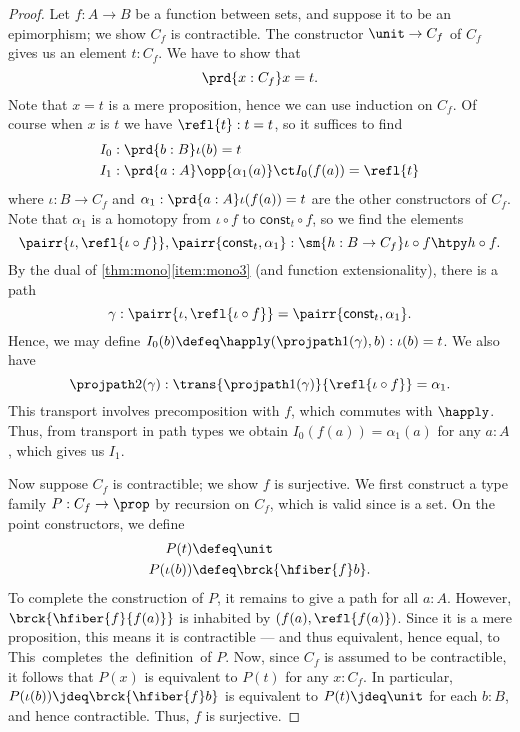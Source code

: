 \begin{proof}
Let $f:A\to B$ be a function between sets, and suppose it to be an epimorphism; we show $C_f$ is contractible.
The constructor $\unit\to C_f$ of $C_f$ gives us an element $t:C_f$.
We have to show that
\begin{equation*}
\prd{x:C_f} x= t.
\end{equation*}
Note that $x= t$ is a mere proposition, hence we can use induction on $C_f$.
Of course when $x$ is $t$ we have $\refl{t}:t=t$, so it suffices to find
\begin{align*}
I_0 & : \prd{b:B} \iota(b)= t\\
I_1 & : \prd{a:A} \opp{\alpha_1(a)} \ct I_0(f(a))=\refl{t}
\end{align*}
where $\iota:B\to C_f$ and $\alpha_1:\prd{a:A} \iota(f(a))= t$ are the other constructors
of $C_f$. Note that $\alpha_1$ is a homotopy from $\iota\circ f$ to
$\mathsf{const}_t\circ f$, so we find the elements
\begin{equation*}
\pairr{\iota,\refl{\iota\circ f}},\pairr{\mathsf{const}_t,\alpha_1}:
\sm{h:B\to C_f} \iota\circ f \htpy h\circ f.
\end{equation*}
By the dual of \cref{thm:mono}\ref{item:mono3} (and function extensionality), there is a path
\begin{equation*}
\gamma:\pairr{\iota,\refl{\iota\circ f}}=\pairr{\mathsf{const}_t,\alpha_1}.
\end{equation*}
Hence, we may define $I_0(b)\defeq \happly(\projpath1(\gamma),b):\iota(b)=t$.
We also have
\[\projpath2(\gamma) : \trans{\projpath1(\gamma)}{\refl{\iota\circ f}} = \alpha_1. \]
This transport involves precomposition with $f$, which commutes with $\happly$.
Thus, from transport in path types we obtain $I_0(f(a)) = \alpha_1(a)$ for any $a:A$, which gives us $I_1$.

Now suppose $C_f$ is contractible; we show $f$ is surjective.
We first construct a type family $P:C_f\to\prop$ by recursion on $C_f$, which is valid since \prop is a set.
On the point constructors, we define
\begin{align*}
P(t) & \defeq \unit\\
P(\iota(b)) & \defeq \brck{\hfiber{f}b}.
\end{align*}
To complete the construction of $P$, it remains to give a path
for all $a:A$.
However, $\brck{\hfiber{f}{f(a)}}$ is inhabited by $(f(a),\refl{f(a)})$.
Since it is a mere proposition, this means it is contractible --- and thus equivalent, hence equal, to \unit.
This completes the definition of $P$.
Now, since $C_f$ is assumed to be contractible, it follows that $P(x)$ is equivalent to $P(t)$ for any $x:C_f$.
In particular, $P(\iota(b))\jdeq \brck{\hfiber{f}b}$ is equivalent to $P(t)\jdeq \unit$ for each $b:B$, and hence contractible.
Thus, $f$ is surjective.


\end{proof}
